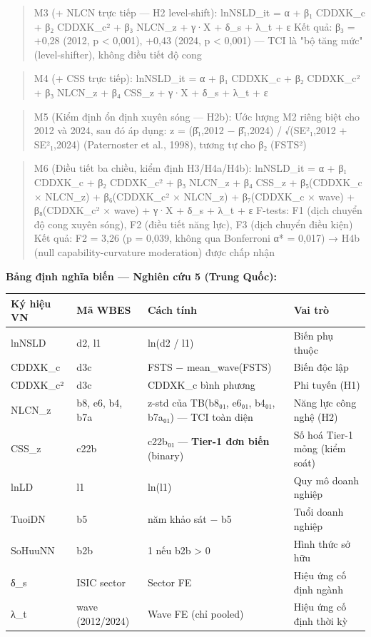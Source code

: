 \documentclass[12pt,a4paper]{article}
\begin{document}
\begin{quote}
M3 (+ NLCN trực tiếp --- H2 level-shift): lnNSLD\_it = α + β₁ CDDXK\_c +
β₂ CDDXK\_c² + β₃ NLCN\_z + γ·X + δ\_s + λ\_t + ε Kết quả: β₃ = +0,28
(2012, p \textless{} 0,001), +0,43 (2024, p \textless{} 0,001) --- TCI
là "bộ tăng mức" (level-shifter), không điều tiết độ cong
\end{quote}

\begin{quote}
M4 (+ CSS trực tiếp): lnNSLD\_it = α + β₁ CDDXK\_c + β₂ CDDXK\_c² + β₃
NLCN\_z + β₄ CSS\_z + γ·X + δ\_s + λ\_t + ε
\end{quote}

\begin{quote}
M5 (Kiểm định ổn định xuyên sóng --- H2b): Ước lượng M2 riêng biệt cho
2012 và 2024, sau đó áp dụng: z = (β̂₁,2012 − β̂₁,2024) / √(SE²₁,2012 +
SE²₁,2024) (Paternoster et al., 1998), tương tự cho β₂ (FSTS²)
\end{quote}

\begin{quote}
M6 (Điều tiết ba chiều, kiểm định H3/H4a/H4b): lnNSLD\_it = α + β₁
CDDXK\_c + β₂ CDDXK\_c² + β₃ NLCN\_z + β₄ CSS\_z + β₅(CDDXK\_c ×
NLCN\_z) + β₆(CDDXK\_c² × NLCN\_z) + β₇(CDDXK\_c × wave) + β₈(CDDXK\_c²
× wave) + γ·X + δ\_s + λ\_t + ε F-tests: F1 (dịch chuyển độ cong xuyên
sóng), F2 (điều tiết năng lực), F3 (dịch chuyển điều kiện) Kết quả: F2 =
3,26 (p = 0,039, không qua Bonferroni α* = 0,017) → H4b (null
capability-curvature moderation) được chấp nhận
\end{quote}

\textbf{Bảng định nghĩa biến --- Nghiên cứu 5 (Trung Quốc):}

\begin{longtable}[]{@{}llll@{}}
\toprule\noalign{}
Ký hiệu VN & Mã WBES & Cách tính & Vai trò \\
\midrule\noalign{}
\endhead
\bottomrule\noalign{}
\endlastfoot
lnNSLD & d2, l1 & ln(d2 / l1) & Biến phụ thuộc \\
CDDXK\_c & d3c & FSTS − mean\_wave(FSTS) & Biến độc lập \\
CDDXK\_c² & d3c & CDDXK\_c bình phương & Phi tuyến (H1) \\
NLCN\_z & b8, e6, b4, b7a & z-std của TB(b8₀₁, e6₀₁, b4₀₁, b7a₀₁) ---
TCI toàn diện & Năng lực công nghệ (H2) \\
CSS\_z & c22b & c22b₀₁ --- \textbf{Tier-1 đơn biến} (binary) & Số hoá
Tier-1 mỏng (kiểm soát) \\
lnLD & l1 & ln(l1) & Quy mô doanh nghiệp \\
TuoiDN & b5 & năm khảo sát − b5 & Tuổi doanh nghiệp \\
SoHuuNN & b2b & 1 nếu b2b \textgreater{} 0 & Hình thức sở hữu \\
δ\_s & ISIC sector & Sector FE & Hiệu ứng cố định ngành \\
λ\_t & wave (2012/2024) & Wave FE (chỉ pooled) & Hiệu ứng cố định thời
kỳ \\
\end{longtable}
\end{document}
